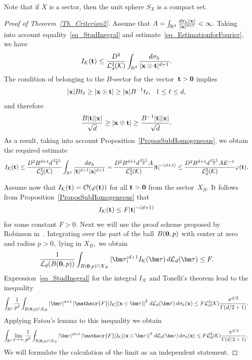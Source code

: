 \documentclass[12pt]{article}
\begin{document}
Note that if $X$ is a sector, then the unit sphere $S_X$ is a compact set.

\begin{proof}[Proof of Theorem~\ref{Th_Criterion2}]

Assume that ${A=\int_{\mathbb{R}^d}\frac{d\sigma_{h}({\bf x})}{|{\bf x}|^{d+1}}<\infty}.$
Taking into account equality~\eqref{eq_StudInegral} and  estimate~\eqref{eq_EstimationforFourier}, we have
$$
I_{\mathcal{K}}({\bf t})\leq\frac{D^2}{\mathcal{L}_d^2(\mathcal{K})}\int_{\mathbb{R}^d}\frac{d\sigma_h}{|{\bf x}\odot{\bf t}|^{d+1}}.
$$
The condition of belonging to the $B$-sector for the vector~${{\bf t}>\bf0}$ implies
$$
|{\bf x}|Bt_\ell\geq|{\bf x}\odot{\bf t}|\geq|{\bf x}|B^{-1}t_\ell,\ \ 1\leq\ell\leq d,
$$
and therefore
$$
\frac{B|{\bf t}||{\bf x}|}{\sqrt{d}}\geq|{\bf x}\odot{\bf t}|\geq\frac{B^{-1}|{\bf t}||{\bf x}|}{\sqrt{d}}.
$$
As a result, taking into account Proposition~\ref{ProposSubHomogeneous}, we obtain the required estimate
$$
I_{\mathcal{K}}({\bf t})\leq\frac{D^2B^{d+1}d^{\frac{d+1}{2}}}{\mathcal{L}_d^2(\mathcal{K})}\int_{\mathbb{R}^d}\frac{d\sigma_h}{|{\bf t}|^{d+1}|{\bf x}|^{d+1}}=\frac{D^2B^{d+1}d^{\frac{d+1}{2}}A}{\mathcal{L}_d^2(\mathcal{K})}|{\bf t}|^{-(d+1)}\leq\frac{D^2B^{d+1}d^{\frac{d+1}{2}}AE^{-1}}{\mathcal{L}_d^2(\mathcal{K})}\varphi({\bf t}).
$$

Assume now that ${I_{\mathcal{K}}({\bf t})=\mathcal{O}(\varphi({\bf t}))}$ for all ${{\bf t}>\bf0}$ from the sector~$X_B.$
It follows from Proposition~\ref{ProposSubHomogeneous} that
$$
I_{\mathcal{K}}({\bf t})\leq F|{\bf t}|^{-(d+1)}
$$
for some constant ${F>0}.$ Next we will use the proof scheme proposed by Robinson in~\cite{Rob}. Integrating over the part of the ball~${B({\bf0},p)}$ with center at zero and radius $p>0,$ lying in $X_B,$ we obtain
$$
\frac{1}{\mathcal{L}_d(B({\bf0},p))}\int_{B({\bf0},p)\cap X_B}|{\bm\tau}|^{d+1}I_{\mathcal{K}}({\bm\tau})\,d\mathcal{L}_d({\bm\tau})\leq F.
$$
Expression~\eqref{eq_StudInegral} for the integral ${I_{\mathcal{K}}}$ and Tonelli's theorem lead to the inequality
$$
\int_{\mathbb{R}^d}\frac{1}{p^d}\int_{B({\bf0},p)\cap X_B}|{\bm\tau}|^{d+1}\left|\mathscr{F}[I_{\mathcal{K}}]({\bf x}\odot{\bm\tau})\right|^2\,d\mathcal{L}_d({\bm\tau})\,d\sigma_h({\bf x})\leq F\mathcal{L}^2_d(\mathcal{K})\frac{\pi^{d/2}}{\Gamma(d/2+1)}.
$$
Applying Fatou's lemma to this inequality we obtain
\begin{equation}\label{eq_Int&Lim}
\int_{\mathbb{R}^d}\lim_{p\to\infty}\frac{1}{p^d}\int_{B({\bf0},p)\cap X_B}|{\bm\tau}|^{d+1}\left|\mathscr{F}[I_{\mathcal{K}}]({\bf x}\odot{\bm\tau})\right|^2\,d\mathcal{L}_d({\bm\tau})\,d\sigma_h({\bf x})\leq F\mathcal{L}^2_d(\mathcal{K})\frac{\pi^{d/2}}{\Gamma(d/2+1)}.
\end{equation}
We will formulate the calculation of the limit as an independent statement.


\end{proof}
\end{document}

